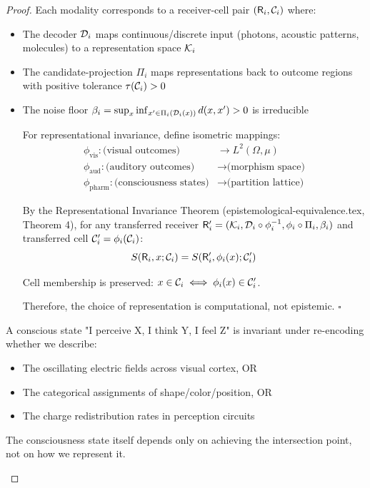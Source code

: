 \begin{proof}
Each modality corresponds to a receiver-cell pair $(\mathsf{R}_i, \mathcal{C}_i)$ where:
\begin{itemize}
\item The decoder $\mathcal{D}_i$ maps continuous/discrete input (photons, acoustic patterns, molecules) to a representation space $\mathcal{K}_i$
\item The candidate-projection $\Pi_i$ maps representations back to outcome regions with positive tolerance $\tau(\mathcal{C}_i) > 0$
\item The noise floor $\beta_i = \sup_x \inf_{x'\in\Pi_i(\mathcal{D}_i(x))} d(x,x') > 0$ is irreducible

For representational invariance, define isometric mappings:
\begin{align}
\phi_{\text{vis}}: \text{(visual outcomes)} &\to L^2(\Omega,\mu) \\
\phi_{\text{aud}}: \text{(auditory outcomes)} &\to \text{(morphism space)} \\
\phi_{\text{pharm}}: \text{(consciousness states)} &\to \text{(partition lattice)}
\end{align}

By the Representational Invariance Theorem (epistemological-equivalence.tex, Theorem 4), for any transferred receiver $\mathsf{R}'_i = (\mathcal{K}_i, \mathcal{D}_i \circ \phi_i^{-1}, \phi_i \circ \Pi_i, \beta_i)$ and transferred cell $\mathcal{C}'_i = \phi_i(\mathcal{C}_i)$:
$$S(\mathsf{R}_i, x; \mathcal{C}_i) = S(\mathsf{R}'_i, \phi_i(x); \mathcal{C}'_i)$$

Cell membership is preserved: $x \in \mathcal{C}_i \iff \phi_i(x) \in \mathcal{C}'_i$.

Therefore, the choice of representation is computational, not epistemic. $\square$
\end{itemize}

\begin{remark}
A conscious state "I perceive X, I think Y, I feel Z" is invariant under re-encoding whether we describe:
\begin{itemize}
\item The oscillating electric fields across visual cortex, OR
\item The categorical assignments of shape/color/position, OR
\item The charge redistribution rates in perception circuits
\end{itemize}
The consciousness state itself depends only on achieving the intersection point, not on how we represent it.
\end{remark}
\end{proof}
